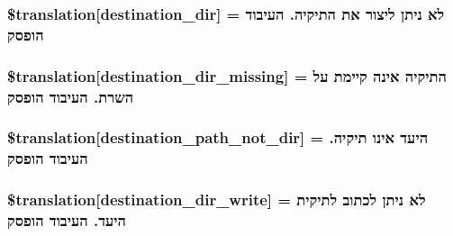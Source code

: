 \subsubsection[{\$translation}]{\setlength{\rightskip}{0pt plus 5cm}\$translation\mbox{[}\textquotesingle{}destination\+\_\+dir\textquotesingle{}\mbox{]} = \textquotesingle{}לא ניתן ליצור את התיקיה. העיבוד הופסק\textquotesingle{}}\label{class_8upload_8he___i_l_8php_aff2427c72a2598aefa6d58df1dd18b08}
\hypertarget{class_8upload_8he___i_l_8php_a9ef28d3cf09942c6c0a1e77fa09185e8}{}
\subsubsection[{\$translation}]{\setlength{\rightskip}{0pt plus 5cm}\$translation\mbox{[}\textquotesingle{}destination\+\_\+dir\+\_\+missing\textquotesingle{}\mbox{]} = \textquotesingle{}התיקיה אינה קיימת על השרת. העיבוד הופסק\textquotesingle{}}\label{class_8upload_8he___i_l_8php_a9ef28d3cf09942c6c0a1e77fa09185e8}
\hypertarget{class_8upload_8he___i_l_8php_a5704a67137126e8c87b7a364175929d4}{}
\subsubsection[{\$translation}]{\setlength{\rightskip}{0pt plus 5cm}\$translation\mbox{[}\textquotesingle{}destination\+\_\+path\+\_\+not\+\_\+dir\textquotesingle{}\mbox{]} = \textquotesingle{}היעד אינו תיקיה. העיבוד הופסק\textquotesingle{}}\label{class_8upload_8he___i_l_8php_a5704a67137126e8c87b7a364175929d4}
\hypertarget{class_8upload_8he___i_l_8php_a97608ea194a616db49141a0e6dee900c}{}
\subsubsection[{\$translation}]{\setlength{\rightskip}{0pt plus 5cm}\$translation\mbox{[}\textquotesingle{}destination\+\_\+dir\+\_\+write\textquotesingle{}\mbox{]} = \textquotesingle{}לא ניתן לכתוב לתיקית היעד. העיבוד הופסק\textquotesingle{}}\label{class_8upload_8he___i_l_8php_a97608ea194a616db49141a0e6dee900c}
\hypertarget{class_8upload_8he___i_l_8php_a40e4e1962226b89fd76da5819a9602b0}{}
